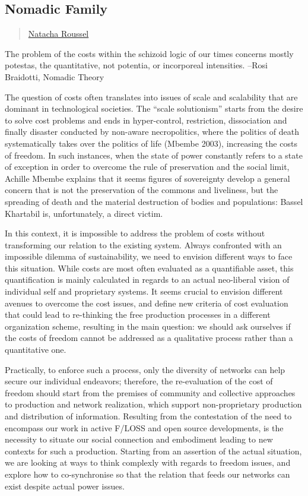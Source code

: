 \subsection{Nomadic Family}\label{nomadic-family}

\begin{quote}
\hyperlink{natacha-roussel}{Natacha Roussel}
\end{quote}

The problem of the costs within the schizoid logic of our times concerns
mostly potestas, the quantitative, not potentia, or incorporeal
intensities. --Rosi Braidotti, Nomadic Theory

The question of costs often translates into issues of scale and
scalability that are dominant in technological societies. The ``scale
solutionism'' starts from the desire to solve cost problems and ends in
hyper-control, restriction, dissociation and finally disaster conducted
by non-aware necropolitics, where the politics of death systematically
takes over the politics of life (Mbembe 2003), increasing the costs of
freedom. In such instances, when the state of power constantly refers to
a state of exception in order to overcome the rule of preservation and
the social limit, Achille Mbembe explains that it seems figures of
sovereignty develop a general concern that is not the preservation of
the commons and liveliness, but the spreading of death and the material
destruction of bodies and populations: Bassel Khartabil is,
unfortunately, a direct victim.

In this context, it is impossible to address the problem of costs
without transforming our relation to the existing system. Always
confronted with an impossible dilemma of sustainability, we need to
envision different ways to face this situation. While costs are most
often evaluated as a quantifiable asset, this quantification is mainly
calculated in regards to an actual neo-liberal vision of individual self
and proprietary systems. It seems crucial to envision different avenues
to overcome the cost issues, and define new criteria of cost evaluation
that could lead to re-thinking the free production processes in a
different organization scheme, resulting in the main question: we should
ask ourselves if the costs of freedom cannot be addressed as a
qualitative process rather than a quantitative one.

Practically, to enforce such a process, only the diversity of networks
can help secure our individual endeavors; therefore, the re-evaluation
of the cost of freedom should start from the premises of community and
collective approaches to production and network realization, which
support non-proprietary production and distribution of information.
Resulting from the contestation of the need to encompass our work in
active F/LOSS and open source developments, is the necessity to situate
our social connection and embodiment leading to new contexts for such a
production. Starting from an assertion of the actual situation, we are
looking at ways to think complexly with regards to freedom issues, and
explore how to co-synchronise so that the relation that feeds our
networks can exist despite actual power issues.

